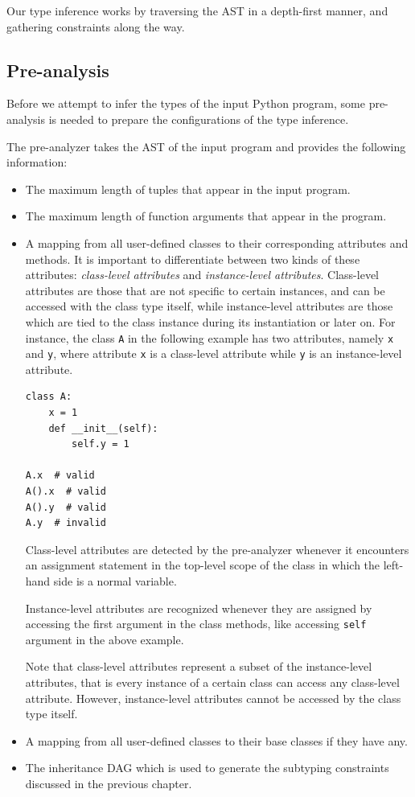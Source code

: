 Our type inference works by traversing the AST in a depth-first manner, and gathering constraints along the way.
\subsection{Pre-analysis}
Before we attempt to infer the types of the input Python program, some pre-analysis is needed to prepare the configurations of the type inference.

The pre-analyzer takes the AST of the input program and provides the following information:

\begin{itemize}
	\item The maximum length of tuples that appear in the input program.
	\item The maximum length of function arguments that appear in the program.
	\item A mapping from all user-defined classes to their corresponding attributes and methods. It is important to differentiate between two kinds of these attributes: \textit{class-level attributes} and \textit{instance-level attributes}. Class-level attributes are those that are not specific to certain instances, and can be accessed with the class type itself, while instance-level attributes are those which are tied to the class instance during its instantiation or later on. For instance, the class \lstinline|A| in the following example has two attributes, namely \lstinline|x| and \lstinline|y|, where attribute \lstinline|x| is a class-level attribute while \lstinline|y| is an instance-level attribute.
	
	\begin{lstlisting}
class A:
	x = 1
	def __init__(self):
		self.y = 1
		
A.x  # valid
A().x  # valid
A().y  # valid
A.y  # invalid
	\end{lstlisting}
	
	Class-level attributes are detected by the pre-analyzer whenever it encounters an assignment statement in the top-level scope of the class in which the left-hand side is a normal variable.
	
	Instance-level attributes are recognized whenever they are assigned by accessing the first argument in the class methods, like accessing \lstinline|self| argument in the above example.
	
	Note that class-level attributes represent a subset of the instance-level attributes, that is every instance of a certain class can access any class-level attribute. However, instance-level attributes cannot be accessed by the class type itself.
	
	\item A mapping from all user-defined classes to their base classes if they have any.
	\item The inheritance DAG which is used to generate the subtyping constraints discussed in the previous chapter.
\end{itemize}

